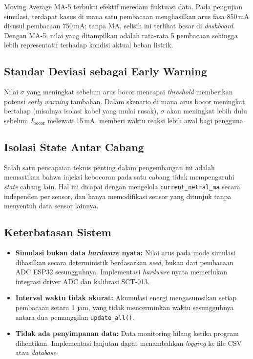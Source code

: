 \documentclass[12pt,a4paper]{article}
\begin{document}
Moving Average MA-5 terbukti efektif meredam fluktuasi data. Pada pengujian
simulasi, terdapat kasus di mana satu pembacaan menghasilkan arus fasa 850\,mA
disusul pembacaan 750\,mA; tanpa MA, selisih ini terlihat besar di
\emph{dashboard}. Dengan MA-5, nilai yang ditampilkan adalah rata-rata 5
pembacaan sehingga lebih representatif terhadap kondisi aktual beban listrik.

\subsection{Standar Deviasi sebagai Early Warning}

Nilai $\sigma$ yang meningkat sebelum arus bocor mencapai \emph{threshold}
memberikan potensi \emph{early warning} tambahan. Dalam skenario di mana arus
bocor meningkat bertahap (misalnya isolasi kabel yang mulai rusak), $\sigma$
akan meningkat lebih dulu sebelum $I_{\text{bocor}}$ melewati 15\,mA, memberi
waktu reaksi lebih awal bagi pengguna.

\subsection{Isolasi State Antar Cabang}

Salah satu pencapaian teknis penting dalam pengembangan ini adalah memastikan
bahwa injeksi kebocoran pada satu cabang tidak mempengaruhi \emph{state} cabang
lain. Hal ini dicapai dengan mengelola \texttt{current\_netral\_ma} secara
independen per sensor, dan hanya memodifikasi sensor yang ditunjuk tanpa
menyentuh data sensor lainnya.

\subsection{Keterbatasan Sistem}

\begin{itemize}
    \item \textbf{Simulasi bukan data \emph{hardware} nyata:} Nilai arus pada mode simulasi dihasilkan secara deterministik berdasarkan \emph{seed}, bukan dari pembacaan ADC ESP32 sesungguhnya. Implementasi \emph{hardware} nyata memerlukan integrasi driver ADC dan kalibrasi SCT-013.
    \item \textbf{Interval waktu tidak akurat:} Akumulasi energi mengasumsikan setiap pembacaan setara 1 jam, yang tidak mencerminkan waktu sesungguhnya antara dua pemanggilan \texttt{update\_all()}.
    \item \textbf{Tidak ada penyimpanan data:} Data monitoring hilang ketika program dihentikan. Implementasi lanjutan dapat menambahkan \emph{logging} ke file CSV atau \emph{database}.
\end{itemize}
\end{document}
